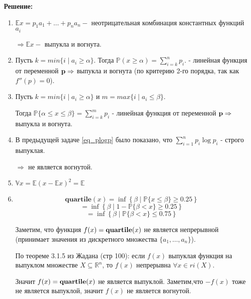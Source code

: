 \documentclass[a4paper,12pt]{article}
\newcommand{\lt}{\left}
\newcommand{\rt}{\right}
\newcommand{\al}{\alpha}
\newcommand{\bb}{\mathbb}
\newcommand{\opn}{\operatorname}
\begin{document}
\textbf{Решение:}

\begin{enumerate}
\item 
$\bb Ex = p_1a_1 + \dots + p_na_n - $ неотрицательная комбинация константных функций $a_i$

$\Rightarrow \bb Ex -$ выпукла и вогнута.

\item 	
Пусть $k  = min\{i \mid a_i \ge \al\}$. Тогда $\bb P(x \ge \al) = \sum \limits_{i = k}^n p_i.$ - линейная функция от переменной $\bf p \Rightarrow$ выпукла и вогнута (по критерию 2-го порядка, так как $f''(p) = 0$).

\item 
Пусть $k  = min\{i \mid a_i \ge \al\}$ и $m = max\{i\mid a_i \le \beta\}$. 

Тогда $\mathbb{P}\{\alpha \le x \le \beta\} = \sum \limits_{i = k}^m p_i$ - линейная функция от переменной $\bf p \Rightarrow$ выпукла и вогнута.

\item В предыдущей задаче \eqref{eq_plogp} было показано, что $\sum\limits_{i=1}^n p_i \log p_i$ - строго выпуклая.

$\Rightarrow$ не является вогнутой.
\item $\mathbb{V}x = \mathbb{E}(x - \mathbb{E}x)^2 = \bb E$

\item $$\mathbf{quartile}(x) = {\opn{inf}}\left\{ \beta \mid \mathbb{P}\{x \le \beta\} \ge 0.25 \right\}$$ $$= {\opn{inf}}\lt\{ \beta \mid 1 - \mathbb{P}\{\beta < x \} \ge 0.25 \rt\}$$ $$= {\opn{inf}}\lt\{ \beta \mid \mathbb{P}\{\beta < x \} \le 0.75 \rt\}$$


Заметим, что функция $f(x) = {\bf quartile}(x)$ не является непрерывной (принимает значения из дискретного множества $\{a_1,\dots, a_n\}$). 

По теореме 3.1.5 из Жадана (стр 100): если $f(x)$ выпуклая функция на выпуклом множестве $X\subseteq \bb R^n$, то  $f(x)$ непрерывна $\forall x \in ri(X)$.

Значит $f(x) = {\bf quartile}(x)$ не является выпуклой. Заметим,что $-f(x)$ тоже не является выпуклой, значит $f(x)$ не является вогнутой.

\end{enumerate}
\end{document}
